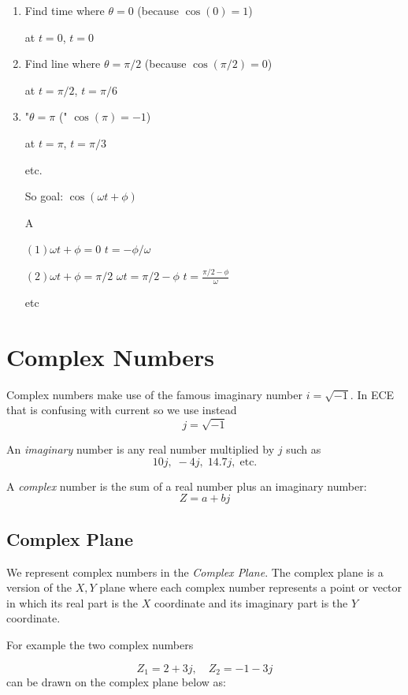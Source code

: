 
\begin{enumerate}
\item Find time where $\theta = 0$ (because $\cos(0) = 1$)

at $t = 0$, $t = 0$

\item Find line where $\theta = \pi/2$ (because $\cos(\pi/2) = 0$)

at $t = \pi/2$, $t = \pi/6$

\item "$\theta = \pi$ (" $\cos(\pi) = -1$)

at $t = \pi$, $t = \pi/3$

etc.

So goal: $\cos(\omega t + \phi)$

A

$(1) \omega t + \phi = 0$
$t = -\phi/\omega$

$(2) \omega t + \phi = \pi/2$
$\omega t = \pi/2 - \phi$
$t = \frac{\pi/2 - \phi}{\omega}$

etc
\end{enumerate}


\section{Complex Numbers}


Complex numbers make use of the famous imaginary number
$i = \sqrt{-1}$.    In ECE that is confusing with current so we use instead
\[
  j = \sqrt{-1}
\]

An {\it imaginary} number is any real number multiplied by $j$ such as
\[
10j,\; -4j,\; 14.7j, \; \mathrm{etc.}
\]

A {\it complex} number is the sum of a real number plus an imaginary number:
\[
  Z = a + bj
\]

\subsection{Complex Plane}

We represent complex numbers in the {\it Complex Plane}.   The complex plane is
a version of the $X,Y$ plane where each complex number represents a point or vector in
which its real part is the $X$ coordinate and its imaginary part is the $Y$ coordinate.

For example the two complex numbers

\[
Z_1 = 2 + 3j, \quad Z_2=-1-3j
\]
can be drawn on the complex plane below as:

